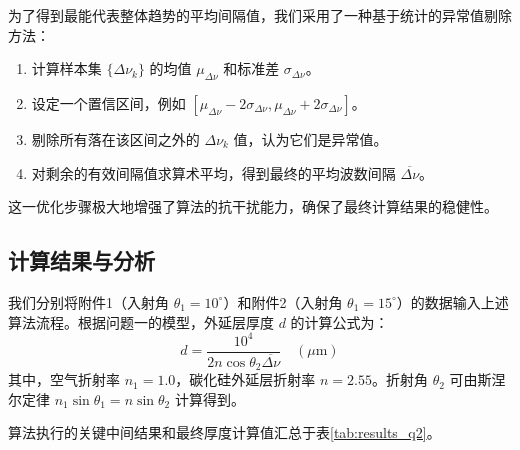 \documentclass{ctexart} %
\begin{document}
为了得到最能代表整体趋势的平均间隔值，我们采用了一种基于统计的异常值剔除方法：
\begin{enumerate}
    \item 计算样本集 $\{\Delta\nu_k\}$ 的均值 $\mu_{\Delta\nu}$ 和标准差 $\sigma_{\Delta\nu}$。
    \item 设定一个置信区间，例如 $[\mu_{\Delta\nu} - 2\sigma_{\Delta\nu}, \mu_{\Delta\nu} + 2\sigma_{\Delta\nu}]$。
    \item 剔除所有落在该区间之外的 $\Delta\nu_k$ 值，认为它们是异常值。
    \item 对剩余的有效间隔值求算术平均，得到最终的平均波数间隔 $\overline{\Delta\nu}$。
\end{enumerate}
这一优化步骤极大地增强了算法的抗干扰能力，确保了最终计算结果的稳健性。

\subsection{计算结果与分析}
我们分别将附件1（入射角 $\theta_1 = 10^\circ$）和附件2（入射角 $\theta_1 = 15^\circ$）的数据输入上述算法流程。根据问题一的模型，外延层厚度 $d$ 的计算公式为：
\begin{equation}
    d = \frac{10^4}{2 n \cos\theta_2 \overline{\Delta\nu}} \quad (\mu\text{m})
\end{equation}
其中，空气折射率 $n_1=1.0$，碳化硅外延层折射率 $n=2.55$。折射角 $\theta_2$ 可由斯涅尔定律 $n_1 \sin\theta_1 = n \sin\theta_2$ 计算得到。

算法执行的关键中间结果和最终厚度计算值汇总于表\ref{tab:results_q2}。
\end{document}
